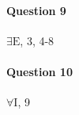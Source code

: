 \documentclass[letterpaper,11pt]{article}
\theoremstyle{mytheor}
\begin{document}
\paragraph{Question 9}\phantom{a} 
\begin{framed}
    $\exists \text{E}$, 3, 4-8
\end{framed}

\paragraph{Question 10}\phantom{a}
\begin{framed}
    $\forall$I, 9
\end{framed}












\end{document}
